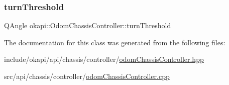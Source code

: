 \subsubsection{\texorpdfstring{turnThreshold}{turnThreshold}}
{\footnotesize\ttfamily Q\+Angle okapi\+::\+Odom\+Chassis\+Controller\+::turn\+Threshold\hspace{0.3cm}{\ttfamily [protected]}}



The documentation for this class was generated from the following files\+:\begin{DoxyCompactItemize}
\item 
include/okapi/api/chassis/controller/\mbox{\hyperlink{odomChassisController_8hpp}{odom\+Chassis\+Controller.\+hpp}}\item 
src/api/chassis/controller/\mbox{\hyperlink{odomChassisController_8cpp}{odom\+Chassis\+Controller.\+cpp}}\end{DoxyCompactItemize}
